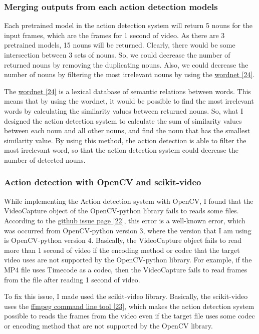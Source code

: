 \documentclass{article}
\begin{document}
\subsubsection{Merging outputs from each action detection models}

Each pretrained model in the action detection system will return 5 nouns for the input frames, which are the frames for 1 second of video. As there are 3 pretrained models, 15 nouns will be returned. Clearly, there would be some intersection between 3 sets of nouns. So, we could decrease the number of returned nouns by removing the duplicating nouns. Also, we could decrease the number of nouns by filtering the most irrelevant nouns by using the \hyperlink{ref24}{wordnet [24]}.

The \hyperlink{ref24}{wordnet [24]} is a lexical database of semantic relations between words. This means that by using the wordnet, it would be possible to find the most irrelevant words by calculating the similarity values between returned nouns. So, what I designed the action detection system to calculate the sum of similarity values between each noun and all other nouns, and find the noun that has the smallest similarity value. By using this method, the action detection is able to filter the most irrelevant word, so that the action detection system could decrease the number of detected nouns.

\subsubsection{Action detection with OpenCV and scikit-video}

While implementing the Action detection system with OpenCV, I found that the VideoCapture object of the OpenCV-python library fails to reads some files. According to the \hyperlink{ref22}{github issue page [22]}, this error is a well-known error, which was occurred from OpenCV-python version 3, where the version that I am using is OpenCV-python version 4. Basically, the VideoCapture object fails to read more than 1 second of video if the encoding method or codec that the target video uses are not supported by the OpenCV-python library. For example, if the MP4 file uses Timecode as a codec, then the VideoCapture fails to read frames from the file after reading 1 second of video.

To fix this issue, I made used the scikit-video library. Basically, the scikit-video uses the \hyperlink{ref23}{ffmpeg command line tool [23]}, which makes the action detection system possible to reads the frames from the video even if the target file uses some codec or encoding method that are not supported by the OpenCV library.
\end{document}
